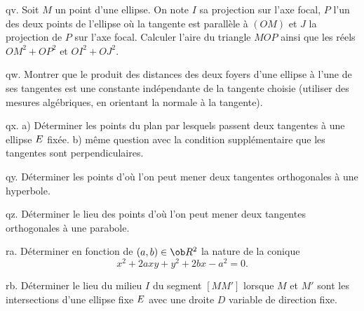 \exo [Level=1,Fight=1,Learn=0,Field=\Coniques,Type=\Exercices,Origin=] qv. 
Soit $M$ un point d'une ellipse. On note $I$ sa projection sur l'axe focal, $P$ l'un des deux points de l'ellipse où la tangente est parallèle à $(OM)$ et $J$ la projection de $P$ sur l'axe focal. 
Calculer l'aire du triangle $MOP$ ainsi que les réels $OM^2+OP^2$ et $OI^2+OJ^2$. 

\exo [Level=1,Fight=1,Learn=0,Field=\Coniques,Type=\Exercices,Origin=] qw. 
Montrer que le produit des distances des deux foyers d'une ellipse à l'une de ses tangentes est une constante indépendante de la tangente choisie (utiliser des mesures algébriques, en orientant la normale à la tangente). 

\exo  [Level=1,Fight=1,Learn=0,Field=\Coniques,Type=\Exercices,Origin=] qx. 
a) Déterminer les points du plan par lesquels passent deux tangentes à une ellipse $\sc E$ fixée. \smallskip\noindent
b) même question avec la condition supplémentaire que les tangentes sont perpendiculaires. 

\exo  [Level=1,Fight=1,Learn=0,Field=\Coniques,Type=\Exercices,Origin=] qy. 
Déterminer les points d'où l'on peut mener deux tangentes orthogonales à une hyperbole. 

\exo  [Level=1,Fight=1,Learn=0,Field=\Coniques,Type=\Exercices,Origin=] qz. 
Déterminer le lieu des points d'où l'on peut mener deux tangentes orthogonales à une parabole. 

\exo  [Level=1,Fight=1,Learn=0,Field=\Coniques,Type=\Exercices,Origin=] ra. 
Déterminer en fonction de $(a,b)\in\ob R^2$ la nature de la conique 
$$
x^2+2axy+y^2+2bx-a^2=0.
$$

\exo  [Level=1,Fight=1,Learn=1,Field=\Coniques,Type=\Exercices,Origin=] rb. 
Déterminer le lieu du milieu $I$ du segment $[MM']$ lorsque $M$ et $M'$ sont les intersections d'une ellipse fixe $\sc E$ avec une droite $D$ variable de direction fixe. 

